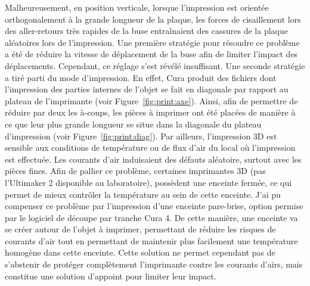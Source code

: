 \documentclass[\main/main.tex]{subfiles}
\begin{document}
%
Malheureusement, en position verticale, lorsque l'impression est orientée orthogonalement à la grande longueur de la plaque, les forces de cisaillement lors des aller-retours très rapides de la buse entraînaient des cassures de la plaque aléatoires lors de l'impression.
%
Une première stratégie pour résoudre ce problème a été de réduire la vitesse de déplacement de la buse afin de limiter l'impact des déplacements. Cependant, ce réglage s'est révélé insuffisant.
%
Une seconde stratégie a tiré parti du mode d'impression. En effet, Cura produit des fichiers dont l'impression des parties internes de l'objet se fait en diagonale par rapport au plateau de l'imprimante (voir Figure~\ref{fig:print:axe}).
Ainsi, afin de permettre de réduire par deux les à-coups, les pièces à imprimer ont été placées de manière à ce que leur plus grande longueur se situe dans la diagonale du plateau d'impression (voir Figure~\ref{fig:print:diag}).
%
Par ailleurs, l'impression 3D est sensible aux conditions de température ou de flux d'air du local où l'impression est effectuée. Les courants d'air induisaient des défauts aléatoire, surtout avec les pièces fines. Afin de pallier ce problème, certaines imprimantes 3D (pas l'Ultimaker 2 disponible au laboratoire), possèdent une enceinte fermée, ce qui permet de mieux contrôler la température au sein de cette enceinte. 
J'ai pu compenser ce problème par l'impression d'une enceinte pare-brise, option permise par le logiciel de découpe par tranche Cura 4.
%
De cette manière, une enceinte va se créer autour de l'objet à imprimer, permettant de réduire les risques de courants d'air tout en permettant de maintenir plus facilement une température homogène dans cette enceinte. Cette solution ne permet cependant pas de s'abstenir de protéger complètement l'imprimante contre les courants d'airs, mais constitue une solution d'appoint pour limiter leur impact.
\end{document}

